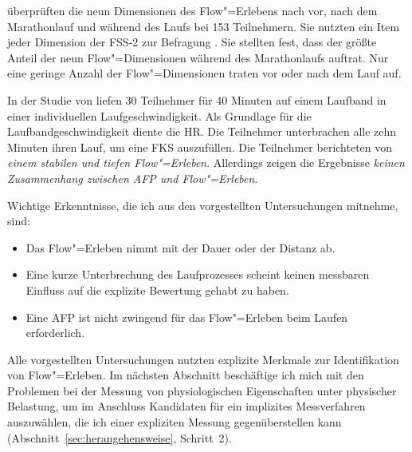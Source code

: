 \citet{Jimenez-Torres2013} überprüften die neun Dimensionen des Flow"=Erlebens nach \citet{Csikszentmihalyi1992} vor, nach dem Marathonlauf und während des Laufs bei 153 Teilnehmern. Sie nutzten ein Item jeder Dimension der \ac{FSS}-2 zur Befragung \citep{Jackson2002}. Sie stellten fest, dass der größte Anteil der neun Flow"=Dimensionen während des Marathonlaufs auftrat. Nur eine geringe Anzahl der Flow"=Dimensionen traten vor oder nach dem Lauf auf. 

In der Studie von \citet{Reinhardt2006} liefen 30 Teilnehmer für 40 Minuten auf einem Laufband in einer individuellen Laufgeschwindigkeit. Als Grundlage für die Laufbandgeschwindigkeit diente die \ac{HR}. Die Teilnehmer unterbrachen alle zehn Minuten ihren Lauf, um eine \ac{FKS} auszufüllen. Die Teilnehmer berichteten von \emph{einem stabilen und tiefen Flow"=Erleben}. Allerdings zeigen die Ergebnisse \emph{keinen Zusammenhang zwischen \ac{AFP} und Flow"=Erleben}.

\newpage

Wichtige Erkenntnisse, die ich aus den vorgestellten Untersuchungen mitnehme, sind: 
\begin{itemize}
	
	\item Das Flow"=Erleben nimmt mit der Dauer oder der Distanz ab.
	
	\item Eine kurze Unterbrechung des Laufprozesses scheint keinen messbaren Einfluss auf die explizite Bewertung gehabt zu haben.
	
	\item Eine \ac{AFP} ist nicht zwingend für das Flow"=Erleben beim Laufen erforderlich. 
\end{itemize}

Alle vorgestellten Untersuchungen nutzten explizite Merkmale zur Identifikation von Flow"=Erleben. Im nächsten Abschnitt beschäftige ich mich mit den Problemen bei der Messung von physiologischen Eigenschaften unter physischer Belastung, um im Anschluss Kandidaten für ein implizites Messverfahren auszuwählen, die ich einer expliziten Messung gegenüberstellen kann (Abschnitt~\ref{sec:herangehensweise}, Schritt~2). 

